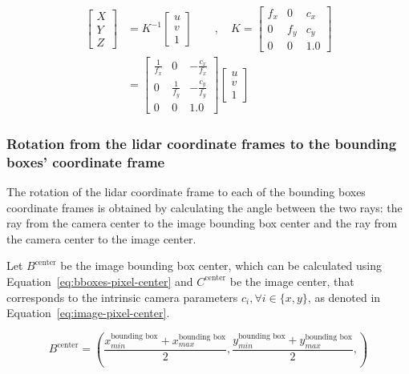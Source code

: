\begin{align}
	\label{eq:back-projection}
	\begin{bmatrix}
		X \\
		Y \\
		Z
	\end{bmatrix}
	 & = K^{-1} 
	\begin{bmatrix}
		u \\
		v \\
		1
	\end{bmatrix}
\qquad , \quad
	K = 
	\begin{bmatrix}
		f_x & 0 & c_x \\
		0 & f_y & c_y \\
		0 & 0 & 1.0
	\end{bmatrix}
\nonumber \\	 
	&  = 
	\begin{bmatrix}
	\frac{1}{f_x} & 0 & -\frac{c_x}{f_x} \\
	0 & \frac{1}{f_y}  & -\frac{c_y}{f_y} \\
	0 & 0 & 1.0 
	\end{bmatrix}
	\begin{bmatrix}
		u \\
		v \\
		1
	\end{bmatrix}
\end{align}

\subsubsection{Rotation from the \ac{lidar} coordinate frames to the bounding boxes' coordinate frame}
The rotation of the \ac{lidar} coordinate frame to each of the bounding boxes coordinate frames is obtained by calculating the angle between the two rays: the ray from the camera center to the image bounding box center and the ray from the camera center to the image center. 

Let $B^\text{center}$ be the image bounding box center, which can be calculated using Equation~\eqref{eq:bboxes-pixel-center} and $C^\text{center}$ be the image center, that corresponds to the intrinsic camera parameters $c_i, \forall i \in \{x, y\}$, as denoted in Equation~\eqref{eq:image-pixel-center}.

\begin{equation}
	\label{eq:bboxes-pixel-center}	
B^\text{center} = \left(\frac{x^{\text{bounding box}}_{min} + x^{\text{bounding box}}_{max}}{2}, \frac{y^{\text{bounding box}}_{min} + y^{\text{bounding box}}_{max}}{2},\right)
\end{equation}

